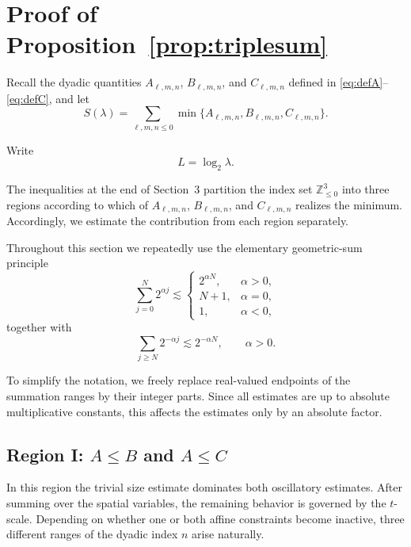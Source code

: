 \documentclass[10pt]{amsart}
\numberwithin{equation}{section}
\theoremstyle{definition}
\theoremstyle{remark}
\theoremstyle{remark}
\begin{document}
	
	
	
	
	
	
	
	
	
	
	
	
	
	\section{Proof of Proposition~\ref{prop:triplesum}}\label{sec:triplesum}
    Recall the dyadic quantities $A_{\ell,m,n}$, $B_{\ell,m,n}$, and
    $C_{\ell,m,n}$ defined in \eqref{eq:defA}--\eqref{eq:defC}, and let
    \[
    S(\lambda)
    =\sum_{\ell,m,n\le0}
    \min\{A_{\ell,m,n},B_{\ell,m,n},C_{\ell,m,n}\}.
    \]

    Write
    \[
    L=\log_2\lambda .
    \]
    
    The inequalities at the end of Section~3 partition the index set
    $\mathbb Z_{\le0}^3$ into three regions according to which of
    $A_{\ell,m,n}$,
    $B_{\ell,m,n}$,
    and
    $C_{\ell,m,n}$
    realizes the minimum.
    Accordingly, we estimate the contribution from each region separately.
    
    Throughout this section we repeatedly use the elementary geometric-sum
    principle
    \[
    \sum_{j=0}^{N}2^{\alpha j}
    \lesssim
    \begin{cases}
    2^{\alpha N},&\alpha>0,\\
    N+1,&\alpha=0,\\
    1,&\alpha<0,
    \end{cases}
    \]
    together with
    \[
    \sum_{j\ge N}2^{-\alpha j}
    \lesssim
    2^{-\alpha N},
    \qquad
    \alpha>0.
    \]

    To simplify the notation, we freely replace real-valued endpoints of the
    summation ranges by their integer parts.
    Since all estimates are up to absolute multiplicative constants, this affects
    the estimates only by an absolute factor.

	
	\subsection{Region I: $A\le B$ and $A\le C$}

    In this region the trivial size estimate dominates both oscillatory
    estimates.
    After summing over the spatial variables, the remaining behavior is governed
    by the $t$-scale.
    Depending on whether one or both affine constraints become inactive, three
    different ranges of the dyadic index $n$ arise naturally.
    
\end{document}
